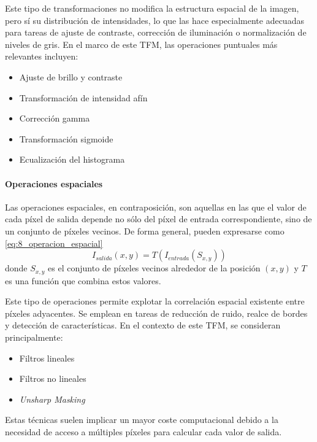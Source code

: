 Este tipo de transformaciones no modifica la estructura espacial de la imagen, pero sí su 
distribución de intensidades, lo que las hace especialmente adecuadas para tareas de ajuste de 
contraste, corrección de iluminación o normalización de niveles de gris. En el marco de este 
TFM, las operaciones puntuales más relevantes incluyen:

\begin{itemize}[noitemsep]
    \item Ajuste de brillo y contraste
    \item Transformación de intensidad afín
    \item Corrección gamma
    \item Transformación sigmoide
    \item Ecualización del histograma
\end{itemize}


\newpage

\paragraph{Operaciones espaciales} \label{subsubsubsec:3_5_1_2_operaciones_espaciales}
Las operaciones espaciales, en contraposición, son aquellas en las que el valor de cada píxel de 
salida depende no sólo del píxel de entrada correspondiente, sino de un conjunto de píxeles vecinos. 
De forma general, pueden expresarse como \eqref{eq:8_operacion_espacial}
\begin{equation}
    I_{salida}(x,y) = T(I_{entrada}(S_{x,y}))
    \label{eq:8_operacion_espacial}
\end{equation}
donde \(S_{x,y}\) es el conjunto de píxeles vecinos alrededor de la posición \((x,y)\) 
y \(T\) es una función que combina estos valores.

Este tipo de operaciones permite explotar la correlación espacial existente entre píxeles adyacentes. 
Se emplean en tareas de reducción de ruido, realce de bordes y detección de características.
En el contexto de este TFM, se consideran principalmente:

\begin{itemize}[noitemsep]
    \item Filtros lineales
    \item Filtros no lineales
    \item \textit{Unsharp Masking}
\end{itemize}
Estas técnicas suelen implicar un mayor coste computacional debido a la necesidad de acceso
a múltiples píxeles para calcular cada valor de salida.

